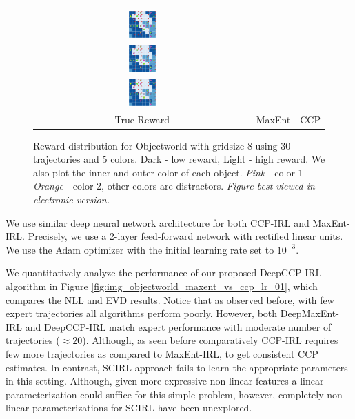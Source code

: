 \documentclass{article}
\def\MSHangBox#1{%
\begin{minipage}[t]{\textwidth}%
\begin{tabbing} %
~\\[-\baselineskip] %
#1 %
\end{tabbing}%
\end{minipage}} %
\begin{document}
\begin{figure}[t]
\centering
  \begin{tabular}{ccc}
    \MSHangBox{\includegraphics[width=0.13\textwidth]{images/objectworld/grid_8_object_20_color_5/reward_map/true_reward_trim.pdf}}&
    \MSHangBox{\includegraphics[width=0.13\textwidth]{images/objectworld/grid_8_object_20_color_5/reward_map/maxent_reward_trim.pdf}}&
    \MSHangBox{\includegraphics[width=0.13\textwidth]{images/objectworld/grid_8_object_20_color_5/reward_map/ccp_reward_trim.pdf}} \\
    True Reward & MaxEnt & CCP \\
    \end{tabular}
    \caption{ Reward distribution for Objectworld with gridsize 8 using 30 trajectories and 5 colors. Dark - low reward, Light - high reward. We also plot the inner and outer color of each object. \textit{Pink} - color 1 \textit{Orange} - color 2, other colors are distractors. \textit{Figure best viewed in electronic version.} }
    \label{fig:img_reward_map_objectworld}
\end{figure}

We use similar deep neural network architecture for both CCP-IRL and MaxEnt-IRL. Precisely, we use a 2-layer feed-forward network with rectified linear units. We use the Adam \cite{kingma2014adam} optimizer with the initial learning rate set to $10^{-3}$.

We quantitatively analyze the performance of our proposed DeepCCP-IRL algorithm in Figure \ref{fig:img_objectworld_maxent_vs_ccp_lr_01}, which compares the NLL and EVD results. Notice that as observed before, with few expert trajectories all algorithms perform poorly. However, both DeepMaxEnt-IRL and DeepCCP-IRL match expert performance with moderate number of trajectories ($\approx 20$). Although, as seen before comparatively CCP-IRL requires few more trajectories as compared to MaxEnt-IRL, to get consistent CCP estimates. In contrast, SCIRL approach fails to learn the appropriate parameters in this setting. Although, given more expressive non-linear features a linear parameterization could suffice for this simple problem, however, completely non-linear parameterizations for SCIRL have been unexplored. 
\end{document}
